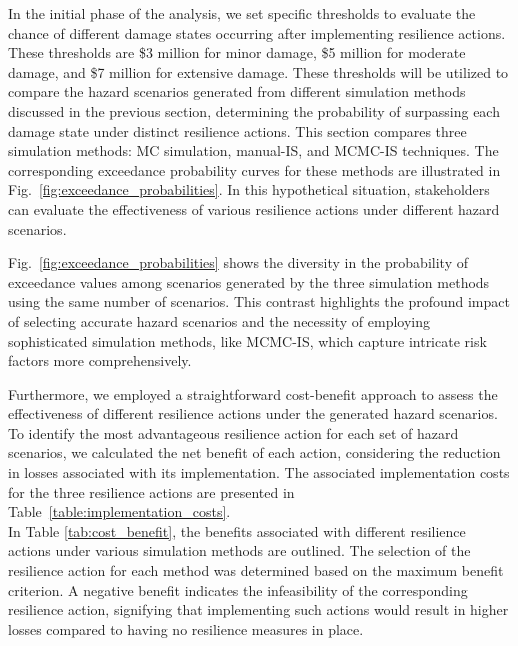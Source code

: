     In the initial phase of the analysis, we set specific thresholds to evaluate the chance of different damage states occurring after implementing resilience actions. These thresholds are \$3 million for minor damage, \$5 million for moderate damage, and \$7 million for extensive damage. These thresholds will be utilized to compare the hazard scenarios generated from different simulation methods discussed in the previous section, determining the probability of surpassing each damage state under distinct resilience actions. This section compares three simulation methods: MC simulation, manual-IS, and MCMC-IS techniques. The corresponding exceedance probability curves for these methods are illustrated in Fig.~\ref{fig:exceedance_probabilities}. In this hypothetical situation, stakeholders can evaluate the effectiveness of various resilience actions under different hazard scenarios.
    
    

    Fig.~\ref{fig:exceedance_probabilities} shows the diversity in the probability of exceedance values among scenarios generated by the three simulation methods using the same number of scenarios. This contrast highlights the profound impact of selecting accurate hazard scenarios and the necessity of employing sophisticated simulation methods, like MCMC-IS, which capture intricate risk factors more comprehensively.

    Furthermore, we employed a straightforward cost-benefit approach to assess the effectiveness of different resilience actions under the generated hazard scenarios. To identify the most advantageous resilience action for each set of hazard scenarios, we calculated the net benefit of each action, considering the reduction in losses associated with its implementation. The associated implementation costs for the three resilience actions are presented in Table~\ref{table:implementation_costs}. \\
        
    
    
    In Table \ref{tab:cost_benefit}, the benefits associated with different resilience actions under various simulation methods are outlined. The selection of the resilience action for each method was determined based on the maximum benefit criterion. A negative benefit indicates the infeasibility of the corresponding resilience action, signifying that implementing such actions would result in higher losses compared to having no resilience measures in place.
        
